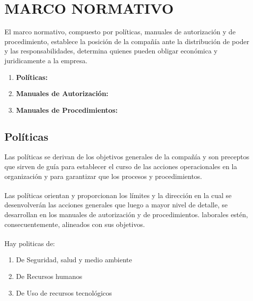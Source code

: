 \documentclass[12pt]{book}
\begin{document}
\chapter{MARCO NORMATIVO}El marco normativo, compuesto por políticas, manuales de autorización y de procedimiento, establece la posición de la 
compañía ante
la distribución de poder y las responsabilidades, determina quienes pueden
obligar económica y juridicamente a la empresa.

	\begin{enumerate}
		\item \textbf{Políticas:}
		\item \textbf{Manuales de Autorización:}
		\item \textbf{Manuales de Procedimientos:}
	\end{enumerate}

\section{Políticas}Las políticas se derivan de los objetivos generales de la compañía y son preceptos que sirven de guía para establecer
el curso de las acciones operacionales en la organización y para garantizar que los procesos y procedimientos. \\ \\
Las políticas orientan y proporcionan los límites y la dirección en la cual se desenvolverán las acciones generales que
luego a mayor nivel de detalle, se desarrollan en los manuales de autorización y de procedimientos.
laborales estén, consecuentemente, alineados con sus objetivos.\\ \\
Hay politicas de:
	\begin{enumerate}
		\item De Seguridad, salud y medio ambiente
		\item De Recursos humanos
		\item De Uso de recursos tecnológicos
	\end{enumerate}
\end{document}
